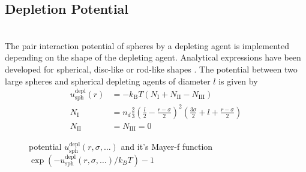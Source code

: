 \newpage
\subsection{Depletion Potential}
~\\

The pair interaction potential of spheres by a depleting agent is implemented depending on the shape of the depleting
agent. Analytical expressions have been developed for
spherical, disc-like or rod-like shapes \cite{Oversteegen2004,Lekkerkerker2011}.
The potential between two large spheres and spherical depleting agents of diameter $l$
is given by
\begin{align}
u^\text{depl}_\text{sph}(r) &= -k_\text{B} T (N_\text{I}+N_\text{II}-N_\text{III}) \\
N_\text{I} &= n_d \frac{2}{3}\left(\frac{l}{2}-\frac{r-\sigma}{2}\right)^2
                \left(\frac{3\sigma}{2}+l+\frac{r-\sigma}{2}\right)\\
N_\text{II} &= N_\text{III} = 0
\end{align}

\begin{figure}[htb]
\centering
  \quad
  \caption{potential $u^\text{depl}_\text{sph}(r,\sigma,\ldots)$ and it's Mayer-f function $\exp(-u^\text{depl}_\text{sph}(r,\sigma,\ldots)/k_BT)-1$}
\end{figure}

